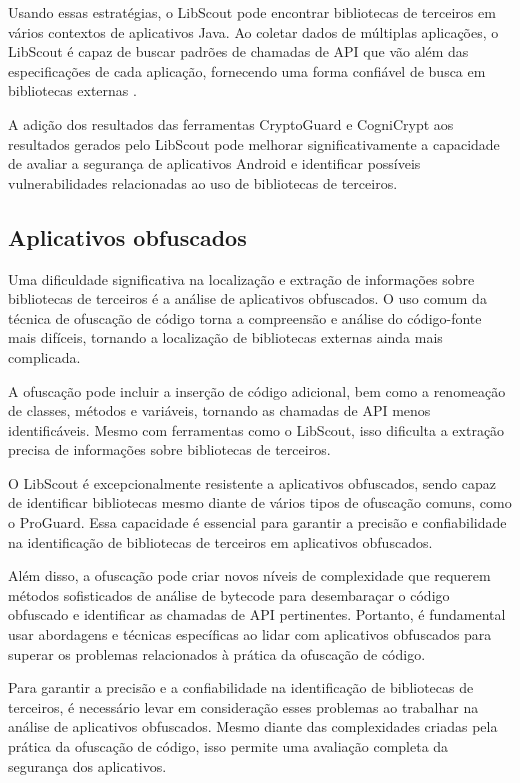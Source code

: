 Usando essas estratégias, o LibScout pode encontrar bibliotecas de terceiros em vários contextos de aplicativos Java. Ao coletar dados de múltiplas aplicações, o LibScout é capaz de buscar padrões de chamadas de API que vão além das especificações de cada aplicação, fornecendo uma forma confiável de busca em bibliotecas externas \cite{LibScout}.

A adição dos resultados das ferramentas CryptoGuard e CogniCrypt aos resultados gerados pelo LibScout pode melhorar significativamente a capacidade de avaliar a segurança de aplicativos Android e identificar possíveis vulnerabilidades relacionadas ao uso de bibliotecas de terceiros.

\subsection{Aplicativos obfuscados} %

Uma dificuldade significativa na localização e extração de informações sobre bibliotecas de terceiros é a análise de aplicativos obfuscados. O uso comum da técnica de ofuscação de código torna a compreensão e análise do código-fonte mais difíceis, tornando a localização de bibliotecas externas ainda mais complicada. \cite{api_tpl_zhang}

A ofuscação pode incluir a inserção de código adicional, bem como a renomeação de classes, métodos e variáveis, tornando as chamadas de API menos identificáveis. \cite{api_tpl_zhang} Mesmo com ferramentas como o LibScout, isso dificulta a extração precisa de informações sobre bibliotecas de terceiros. \cite{LibScout}

O LibScout é excepcionalmente resistente a aplicativos obfuscados, sendo capaz de identificar bibliotecas mesmo diante de vários tipos de ofuscação comuns, como o ProGuard. Essa capacidade é essencial para garantir a precisão e confiabilidade na identificação de bibliotecas de terceiros em aplicativos obfuscados. \cite{LibScout}

Além disso, a ofuscação pode criar novos níveis de complexidade que requerem métodos sofisticados de análise de bytecode para desembaraçar o código obfuscado e identificar as chamadas de API pertinentes. Portanto, é fundamental usar abordagens e técnicas específicas ao lidar com aplicativos obfuscados para superar os problemas relacionados à prática da ofuscação de código. \cite{api_tpl_zhang}

Para garantir a precisão e a confiabilidade na identificação de bibliotecas de terceiros, é necessário levar em consideração esses problemas ao trabalhar na análise de aplicativos obfuscados. Mesmo diante das complexidades criadas pela prática da ofuscação de código, isso permite uma avaliação completa da segurança dos aplicativos.

